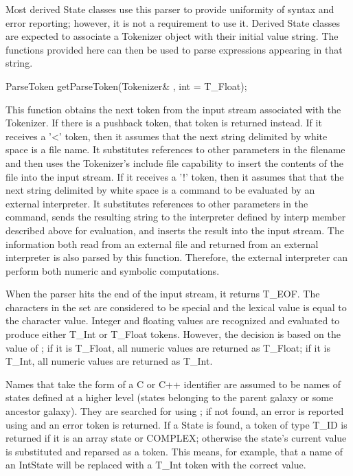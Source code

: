 Most derived State classes use this parser to provide uniformity
of syntax and error reporting; however, it is not a requirement to
use it.
Derived State classes are expected to associate a Tokenizer object
with their initial value string.
The functions provided here can then be used to parse expressions
appearing in that string.

\begin{example}
ParseToken getParseToken(Tokenizer& , int = T_Float);
\end{example}

This function obtains the next token from the input stream associated
with the Tokenizer.
If there is a pushback token, that token is returned instead.
If it receives a '<' token, then it assumes that the next string delimited
by white space is a file name.
It substitutes references to other parameters in the filename and then
uses the Tokenizer's include file capability to insert the contents of
the file into the input stream.
If it receives a '!' token, then it assumes that that the next string delimited 
by white space is a command to be evaluated by an external interpreter.
It substitutes references to other parameters in the command,
sends the resulting string to the interpreter defined by interp member
described above for evaluation, and inserts the result into the input stream.
The information both read from an external file and returned from an external
interpreter is also parsed by this function.
Therefore, the external interpreter can perform both numeric and symbolic
computations.

When the parser hits the end of the input stream, it returns T_EOF.
The characters in the set \code{,[]+*-/()^} are considered to be special
and the lexical value is equal to the character value.
Integer and floating values are recognized and evaluated to produce
either T_Int or T_Float tokens.  However, the decision is based on
the value of ; if it is T_Float, all numeric values
are returned as T_Float; if it is T_Int, all numeric values are returned
as T_Int.

Names that take the form of a
C or C++ identifier are assumed to be names of states defined at a
higher level (states belonging to the parent galaxy or some ancestor
galaxy).  They are searched for using ; if not found,
an error is reported using  and an error token is
returned.  If a State is found, a token of type T_ID is returned if
it is an array state or COMPLEX; otherwise the state's current value
is substituted and reparsed as a token.  This means, for example, that
a name of an IntState will be replaced with a T_Int token with the
correct value.

